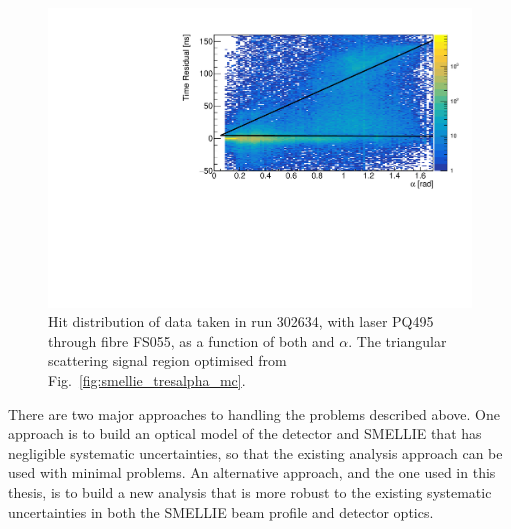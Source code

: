 \begin{figure}[!th]
    \centering
    \includegraphics[width=\textwidth]{5_SMELLIEAnalysis/images/FS055_PQ495_302634_data_tres_alpha_plot.pdf}
    \caption[Hit distribution of SMELLIE data taken in run \num{302634}, with laser PQ495 through fibre FS055, as a function of both \tres{} and $\alpha$]
    {Hit distribution of data taken in run \num{302634}, with laser PQ495 through fibre FS055, as a function of both \tres{} and $\alpha$. The triangular scattering signal region optimised from Fig.~\ref{fig:smellie_tresalpha_mc}.}
    \label{fig:smellie_tresalpha_data}
\end{figure}

There are two major approaches to handling the problems described above. One approach is to build an optical model of the detector and SMELLIE that has negligible systematic uncertainties, so that the existing analysis approach can be used with minimal problems. An alternative approach, and the one used in this thesis, is to build a new analysis that is more robust to the existing systematic uncertainties in both the SMELLIE beam profile and detector optics.


